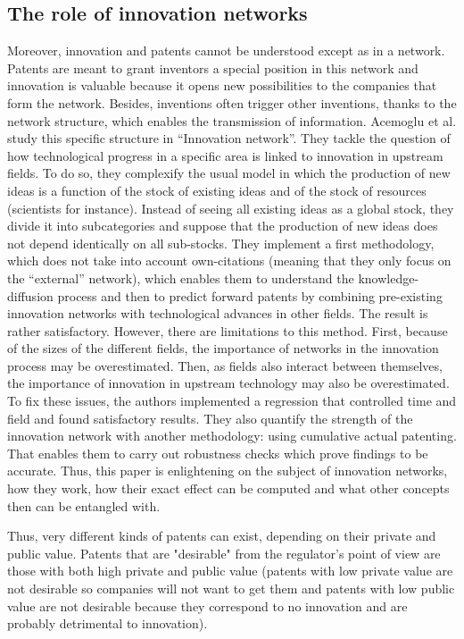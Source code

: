 \documentclass[12pt]{article}
\begin{document}
\subsection{The role of innovation networks}
Moreover, innovation and patents cannot be understood except as in a network. Patents are meant to grant inventors a special position in this network and innovation is valuable because it opens new possibilities to the companies that form the network. Besides, inventions often trigger other inventions, thanks to the network structure, which enables the transmission of information. Acemoglu et al. study this specific structure in “Innovation network”. They tackle the question of how technological progress in a specific area is linked to innovation in upstream fields. To do so, they complexify the usual model in which the production of new ideas is a function of the stock of existing ideas and of the stock of resources (scientists for instance). Instead of seeing all existing ideas as a global stock, they divide it into subcategories and suppose that the production of new ideas does not depend identically on all sub-stocks. They implement a first methodology, which does not take into account own-citations (meaning that they only focus on the “external” network), which enables them to understand the knowledge-diffusion process and then to predict forward patents by combining pre-existing innovation networks with technological advances in other fields. The result is rather satisfactory. However, there are limitations to this method. First, because of the sizes of the different fields, the importance of networks in the innovation process may be overestimated. Then, as fields also interact between themselves, the importance of innovation in upstream technology may also be overestimated. To fix these issues, the authors implemented a regression that controlled time and field and found satisfactory results. They also quantify the strength of the innovation network with another methodology: using cumulative actual patenting. That enables them to carry out robustness checks which prove findings to be accurate. Thus, this paper is enlightening on the subject of innovation networks, how they work, how their exact effect can be computed and what other concepts then can be entangled with. 

Thus, very different kinds of patents can exist, depending on their private and public value. Patents that are "desirable" from the regulator's point of view are those with both high private and public value (patents with low private value are not desirable so companies will not want to get them and patents with low public value are not desirable because they correspond to no innovation and are probably detrimental to innovation). 
\end{document}

